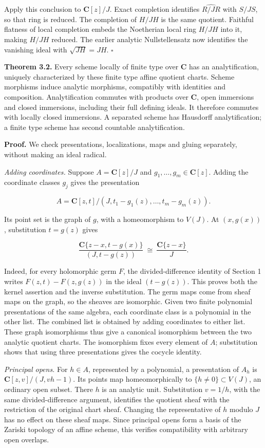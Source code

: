 \documentclass[11pt]{article}
\begin{document}
Apply this conclusion to \(\mathbf C[z]/J\). Exact completion identifies
\(\widehat{R/JR}\) with \(S/JS\), so that ring is reduced. The
completion of \(H/JH\) is the same quotient. Faithful flatness of local
completion embeds the Noetherian local ring \(H/JH\) into it, making
\(H/JH\) reduced. The earlier analytic Nullstellensatz now identifies
the vanishing ideal with \(\sqrt{JH}=JH\). \(\square\)

\textbf{Theorem 3.2.} Every scheme locally of finite type over
\(\mathbf C\) has an analytification, uniquely characterized by these
finite type affine quotient charts. Scheme morphisms induce analytic
morphisms, compatibly with identities and composition. Analytification
commutes with products over \(\mathbf C\), open immersions and closed
immersions, including their full defining ideals. It therefore commutes
with locally closed immersions. A separated scheme has Hausdorff
analytification; a finite type scheme has second countable
analytification.

\textbf{Proof.} We check presentations, localizations, maps and gluing
separately, without making an ideal radical.

\emph{Adding coordinates.} Suppose \(A=\mathbf C[z]/J\) and
\(g_1,\ldots,g_m\in\mathbf C[z]\). Adding the coordinate classes \(g_j\)
gives the presentation

\[
A=\mathbf C[z,t]/(J,t_1-g_1(z),\ldots,t_m-g_m(z)).
\]

Its point set is the graph of \(g\), with a homeomorphism to \(V(J)\).
At \((x,g(x))\), substitution \(t=g(z)\) gives

\[
\frac{\mathbf C\{z-x,t-g(x)\}}{(J,t-g(z))}
\ \cong\ \frac{\mathbf C\{z-x\}}{J}.
\]

Indeed, for every holomorphic germ \(F\), the divided-difference
identity of Section 1 writes \(F(z,t)-F(z,g(z))\) in the ideal
\((t-g(z))\). This proves both the kernel assertion and the inverse
substitution. The germ maps come from sheaf maps on the graph, so the
sheaves are isomorphic. Given two finite polynomial presentations of the
same algebra, each coordinate class is a polynomial in the other list.
The combined list is obtained by adding coordinates to either list.
These graph isomorphisms thus give a canonical isomorphism between the
two analytic quotient charts. The isomorphism fixes every element of
\(A\); substitution shows that using three presentations gives the
cocycle identity.

\emph{Principal opens.} For \(h\in A\), represented by a polynomial, a
presentation of \(A_h\) is \(\mathbf C[z,v]/(J,vh-1)\). Its points map
homeomorphically to \(\{h\ne0\}\subset V(J)\), an ordinary open subset.
There \(h\) is an analytic unit. Substitution \(v=1/h\), with the same
divided-difference argument, identifies the quotient sheaf with the
restriction of the original chart sheaf. Changing the representative of
\(h\) modulo \(J\) has no effect on these sheaf maps. Since principal
opens form a basis of the Zariski topology of an affine scheme, this
verifies compatibility with arbitrary open overlaps.
\end{document}

